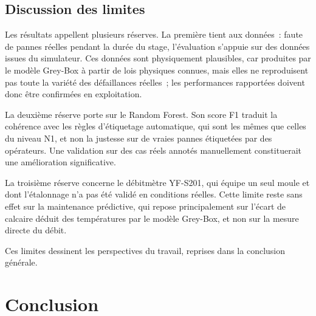 \subsection{Discussion des limites}

Les résultats appellent plusieurs réserves. La première tient aux données~: faute de pannes réelles pendant la durée du stage, l'évaluation s'appuie sur des données issues du simulateur. Ces données sont physiquement plausibles, car produites par le modèle Grey-Box à partir de lois physiques connues, mais elles ne reproduisent pas toute la variété des défaillances réelles~; les performances rapportées doivent donc être confirmées en exploitation.

La deuxième réserve porte sur le Random Forest. Son score F1 traduit la cohérence avec les règles d'étiquetage automatique, qui sont les mêmes que celles du niveau N1, et non la justesse sur de vraies pannes étiquetées par des opérateurs. Une validation sur des cas réels annotés manuellement constituerait une amélioration significative.

La troisième réserve concerne le débitmètre YF-S201, qui équipe un seul moule et dont l'étalonnage n'a pas été validé en conditions réelles. Cette limite reste sans effet sur la maintenance prédictive, qui repose principalement sur l'écart de calcaire déduit des températures par le modèle Grey-Box, et non sur la mesure directe du débit.

Ces limites dessinent les perspectives du travail, reprises dans la conclusion générale.

\section*{Conclusion}

